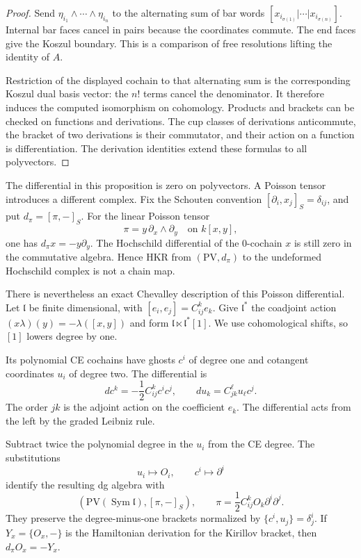 \begin{proof}
Send $\eta_{i_1}\wedge\cdots\wedge\eta_{i_n}$ to the alternating
sum of bar words $[x_{i_{\sigma(1)}}|\cdots|x_{i_{\sigma(n)}}]$.
Internal bar faces cancel in pairs because the coordinates commute.
The end faces give the Koszul boundary. This is a comparison of
free resolutions lifting the identity of $A$.

Restriction of the displayed cochain to that alternating sum is
the corresponding Koszul dual basis vector: the $n!$ terms cancel
the denominator. It therefore induces the computed isomorphism
on cohomology. Products and brackets can be checked on functions
and derivations. The cup classes of derivations anticommute, the
bracket of two derivations is their commutator, and their action
on a function is differentiation. The derivation identities extend
these formulas to all polyvectors.
\end{proof}

The differential in this proposition is zero on polyvectors.
A Poisson tensor introduces a different complex. Fix the Schouten
convention $[\partial_i,x_j]_S=\delta_{ij}$, and put
$d_\pi=[\pi,-]_S$. For the linear Poisson tensor
\[
 \pi=y\,\partial_x\wedge\partial_y
 \quad\text{on }k[x,y],
\]
one has $d_\pi x=-y\partial_y$. The Hochschild differential of the
$0$-cochain $x$ is still zero in the commutative algebra. Hence HKR
from $(\mathrm{PV},d_\pi)$ to the undeformed Hochschild complex is
not a chain map.

There is nevertheless an exact Chevalley description of this
Poisson differential. Let $\mathfrak l$ be finite dimensional, with
$[e_i,e_j]=C^k_{ij}e_k$. Give $\mathfrak l^*$ the coadjoint action
$(x\lambda)(y)=-\lambda([x,y])$ and form
$\mathfrak l\ltimes\mathfrak l^*[1]$. We use cohomological shifts,
so $[1]$ lowers degree by one. 

Its polynomial CE cochains have
ghosts $c^i$ of degree one and cotangent coordinates $u_i$ of
degree two. The differential is
\begin{equation}\label{mht:eq:centre-ce-signs}
 dc^k=-\frac12C^k_{ij}c^ic^j,
 \qquad du_k=C^\ell_{jk}u_\ell c^j.
\end{equation}
The order $jk$ is the adjoint action on the coefficient $e_k$.
The differential acts from the left by the graded Leibniz rule.

\begin{proposition}\label{mht:prop:finite-centre-coordinates}
Subtract twice the polynomial degree in the $u_i$ from the CE
degree. The substitutions
\[
 u_i\longmapsto O_i,\qquad c^i\longmapsto\partial^i
\]
identify the resulting dg algebra with
\[
 \left(\mathrm{PV}(\operatorname{Sym}\mathfrak l),[\pi,-]_S\right),
 \qquad
 \pi=\frac12C^k_{ij}O_k\partial^i\partial^j.
\]
They preserve the degree-minus-one brackets normalized by
$\{c^i,u_j\}=\delta^i_j$. If $Y_x=\{O_x,-\}$ is the
Hamiltonian derivation for the Kirillov bracket, then
$d_\pi O_x=-Y_x$.
\end{proposition}


